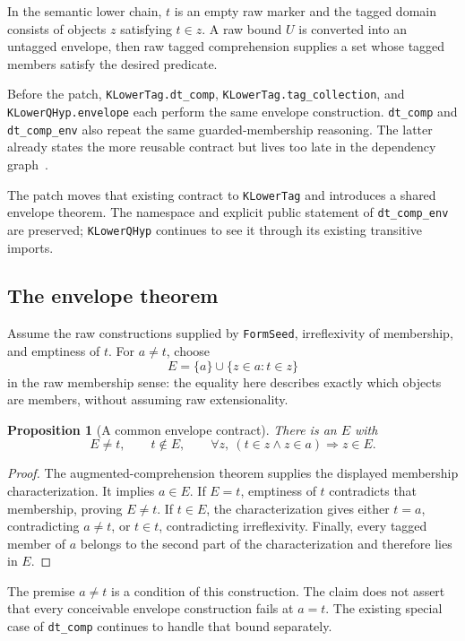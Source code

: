 \documentclass[11pt,letterpaper]{article}
\newtheorem{proposition}[theorem]{Proposition}
\theoremstyle{definition}\newtheorem{definition}[theorem]{Definition}
\theoremstyle{remark}\newtheorem{remark}[theorem]{Remark}
\newcommand{\code}[1]{\texttt{\small #1}}
\begin{document}
In the semantic lower chain, $t$ is an empty raw marker and the tagged domain consists of objects $z$ satisfying $t\in z$. A raw bound $U$ is converted into an untagged envelope, then raw tagged comprehension supplies a set whose tagged members satisfy the desired predicate.

Before the patch, \code{KLowerTag.dt\_comp}, \code{KLowerTag.tag\_collection}, and \code{KLowerQHyp.envelope} each perform the same envelope construction. \code{dt\_comp} and \code{dt\_comp\_env} also repeat the same guarded-membership reasoning. The latter already states the more reusable contract but lives too late in the dependency graph~\cite{lowerfiles}.

The patch moves that existing contract to \code{KLowerTag} and introduces a shared envelope theorem. The namespace and explicit public statement of \code{dt\_comp\_env} are preserved; \code{KLowerQHyp} continues to see it through its existing transitive imports.

\subsection{The envelope theorem}

Assume the raw constructions supplied by \code{FormSeed}, irreflexivity of membership, and emptiness of $t$. For $a\ne t$, choose
\[
 E=\{a\}\cup\{z\in a:t\in z\}
\]
in the raw membership sense: the equality here describes exactly which objects are members, without assuming raw extensionality.

\begin{proposition}[A common envelope contract]
There is an $E$ with
\[
 E\ne t,\qquad t\notin E,\qquad
 \forall z,\ (t\in z\land z\in a)\Rightarrow z\in E.
\]
\end{proposition}
\begin{proof}
The augmented-comprehension theorem supplies the displayed membership characterization. It implies $a\in E$. If $E=t$, emptiness of $t$ contradicts that membership, proving $E\ne t$. If $t\in E$, the characterization gives either $t=a$, contradicting $a\ne t$, or $t\in t$, contradicting irreflexivity. Finally, every tagged member of $a$ belongs to the second part of the characterization and therefore lies in $E$.
\end{proof}

The premise $a\ne t$ is a condition of this construction. The claim does not assert that every conceivable envelope construction fails at $a=t$. The existing special case of \code{dt\_comp} continues to handle that bound separately.
\end{document}
